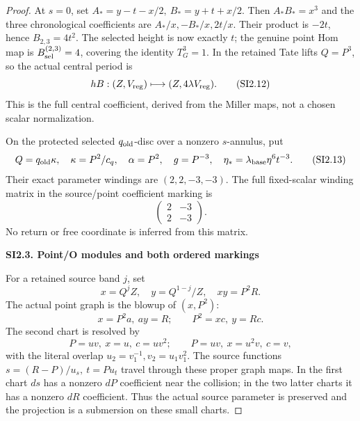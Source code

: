 \begin{proof}
At \(s=0\), set \(A_*=y-t-x/2,\ B_*=y+t+x/2\).
Then \(A_*B_*=x^3\) and the three chronological coefficients are
\(A_*/x,-B_*/x,2t/x\). Their product is \(-2t\), hence
\(B_{2,3}=4t^2\). The selected height is now exactly \(t\);
the genuine point Hom map is \(B_{\rm sel}^{(2,3)}=4\), covering
the identity \(T_G^3=1\). In the retained Tate lifts \(Q=P^3\),
so the actual central period is
\[
 hB:(Z,V_{\rm reg})\longmapsto(Z,4\lambda V_{\rm reg}).
 \tag{SI2.12}
\]
This is the full central coefficient, derived from the Miller
maps, not a chosen scalar normalization.

On the protected selected \(q_{\rm old}\)-disc over a nonzero
\(s\)-annulus, put
\[
 Q=q_{\rm old}\kappa,\quad \kappa=P^2/c_q,\quad
 \alpha=P^2,\quad g=P^{-3},\quad
 \eta_*=\lambda_{\rm base}\eta^6t^{-3}.
 \tag{SI2.13}
\]
Their exact parameter windings are \((2,2,-3,-3)\). The full
fixed-scalar winding matrix in the source/point coefficient marking is
\[
 \begin{pmatrix}2&-3\\2&-3\end{pmatrix}.
 \tag{SI2.14}
\]
No return or free coordinate is inferred from this matrix.

\par

\medskip\noindent\textbf{SI2.3. Point/O modules and both ordered markings}

\par\nobreak

For a retained source band \(j\), set
\[
 x=Q^jZ,\quad y=Q^{1-j}/Z,\quad xy=P^2R.
\]
The actual point graph is the blowup of \((x,P^2)\):
\[
 x=P^2a,\ ay=R;\qquad P^2=xc,\ y=Rc.
 \tag{SI2.15}
\]
The second chart is resolved by
\[
 P=uv,\ x=u,\ c=uv^2;\qquad P=uv,\ x=u^2v,\ c=v,
 \tag{SI2.16}
\]
with the literal overlap \(u_2=v_1^{-1},v_2=u_1v_1^2\).
The source functions \(s=(R-P)/u_s,\ t=Pu_t\) travel through these
proper graph maps. In the first chart \(ds\) has a nonzero \(dP\)
coefficient near the collision; in the two latter charts it has
a nonzero \(dR\) coefficient. Thus the actual source parameter is
preserved and the projection is a submersion on these small charts.


\end{proof}
